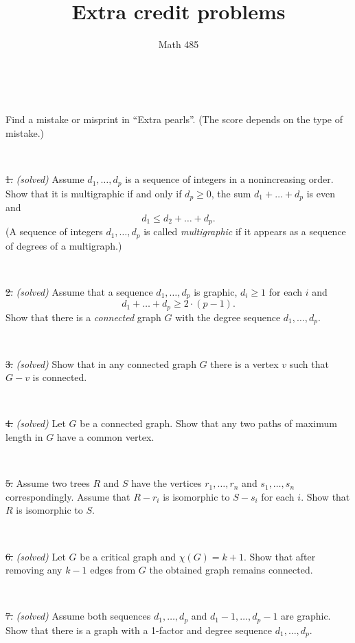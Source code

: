 \documentclass[oneside,a4paper]{article}
\begin{document}
%
\title{Extra credit problems}
\author{Math 485}
\date{}
\maketitle

\textit{}


\ 

 Find a mistake or misprint in ``Extra pearls''.
(The score depends on the type of mistake.)


\ 

\noindent \sout{1.} \textit{(solved)}
Assume $d_1,\dots, d_p$ is a sequence of integers in a nonincreasing order.
Show that it is multigraphic if and only if $d_p\ge0$, the sum $d_1+\dots+ d_p$ is even and 
\[d_1\le d_2+\dots+d_p.\]
(A sequence of integers $d_1,\dots, d_p$ is called \textit{multigraphic} if it appears as a sequence of degrees of a multigraph.)

\ 

\noindent \sout{2.} \textit{(solved)}
Assume that a sequence $d_1,\dots, d_p$ is graphic,
$d_i\ge 1$ for each $i$ and 
\[d_1+\dots+d_p\ge 2\cdot(p-1).\]
Show that there is a \textit{connected} graph $G$ with the degree sequence $d_1,\dots, d_p$.


\ 

\noindent 
\sout{3.} \textit{(solved)}
Show that in any connected graph $G$ there is a vertex $v$ such that $G-v$ is connected.

\ 


\noindent
\sout{4.} \textit{(solved)}
Let $G$ be a  connected graph.
Show that any two paths of maximum length in $G$ have a common vertex.


\ 

\noindent %
\sout{5.} %
Assume two trees $R$ and $S$ 
have the vertices $r_1,\dots,r_n$ and $s_1,\dots,s_n$ correspondingly.
Assume that $R-r_i$ is isomorphic to $S-s_i$ for each $i$.
Show that $R$ is isomorphic to $S$.

\ 

\noindent 
\sout{6.} \textit{(solved)}
Let $G$ be a critical graph and $\chi(G)=k+1$.
Show that after removing any $k-1$ edges from $G$  
the obtained graph remains connected. 

\ 

\noindent %
\sout{7.} \textit{(solved)}
Assume both sequences $d_1,\dots, d_p$
 and $d_1-1,\dots, d_p-1$ are graphic.
Show that there is a graph with a 1-factor and degree sequence $d_1,\dots, d_p$.
\end{document}
